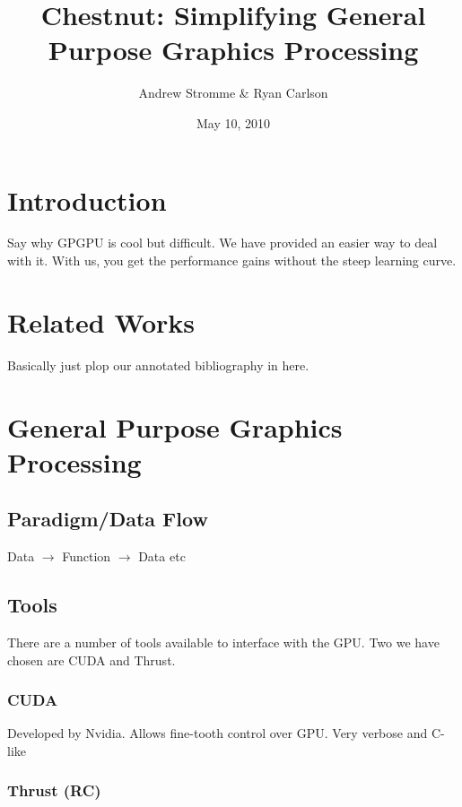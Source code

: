 \documentclass{article}
\begin{document}
\title{Chestnut: Simplifying General Purpose Graphics Processing}
\author{Andrew Stromme \& Ryan Carlson}
\date{May 10, 2010}
\maketitle

\begin{abstract}
\end{abstract}

\section{Introduction}

Say why GPGPU is cool but difficult. We have provided an easier way to deal with it. With us, you get the performance gains without the steep learning curve.

\section{Related Works}

Basically just plop our annotated bibliography in here.

\section{General Purpose Graphics Processing}

\subsection{Paradigm/Data Flow}

Data $\rightarrow$ Function $\rightarrow$ Data etc

\subsection{Tools}

There are a number of tools available to interface with the GPU. Two we have chosen are CUDA and Thrust.

\subsubsection{CUDA}

Developed by Nvidia. Allows fine-tooth control over GPU. Very verbose and C-like

\subsubsection{Thrust (RC)}
\end{document}
